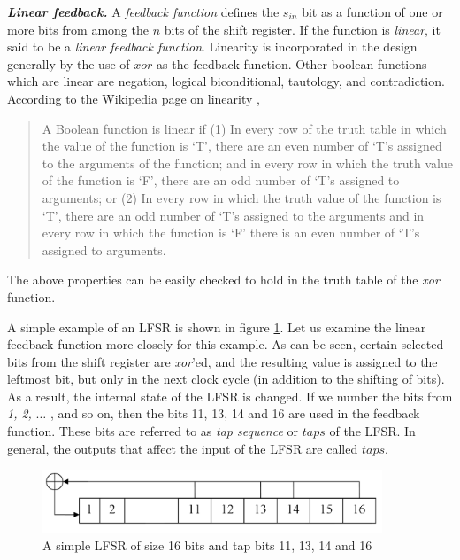 \textbf{\emph{Linear feedback.}} A \textit{feedback function} defines the $s_{in}$ bit as a function of one or more bits from among the $n$ bits of the shift register. If the function is \textit{linear}, it said to be a \textit{linear feedback function}. Linearity is incorporated in the design generally by the use of $xor$ as the feedback function. Other boolean functions which are linear are negation, logical biconditional, tautology, and contradiction. According to the Wikipedia page on linearity \cite{linear-wiki}, 
\begin{quote}
\footnotesize{A Boolean function is linear if (1) In every row of the truth table in which the value of the function is `T', there are an even number of `T's assigned to the arguments of the function; and in every row in which the truth value of the function is `F', there are an odd number of `T's assigned to arguments; or (2) In every row in which the truth value of the function is `T', there are an odd number of `T's assigned to the arguments and in every row in which the function is `F' there is an even number of `T's assigned to arguments.
}
\end{quote}

The above properties can be easily checked to hold in the truth table of the \emph{xor} function.

A simple example of an LFSR is shown in figure \ref{fig:lfsr-example1}. Let us examine the linear feedback function more closely for this example. As can be seen, certain selected bits from the shift register are \emph{xor}'ed, and the resulting value is assigned to the leftmost bit, but only in the next clock cycle (in addition to the shifting of bits). As a result, the internal state of the LFSR is changed. If we number the bits from \emph{1, 2,} $\ldots$ , and so on, then the bits 11, 13, 14 and 16 are used in the feedback function. These bits are referred to as \emph{tap sequence} or $taps$ of the LFSR. In general, the outputs that affect the input of the LFSR are called $taps$.\\


\begin{figure}[ht!]
	\centering
		\includegraphics[width=4in]{./figures/lfsr-example.PNG}
	\caption{A simple LFSR of size 16 bits and tap bits 11, 13, 14 and 16}	
	\label{fig:lfsr-example1}
\end{figure}

